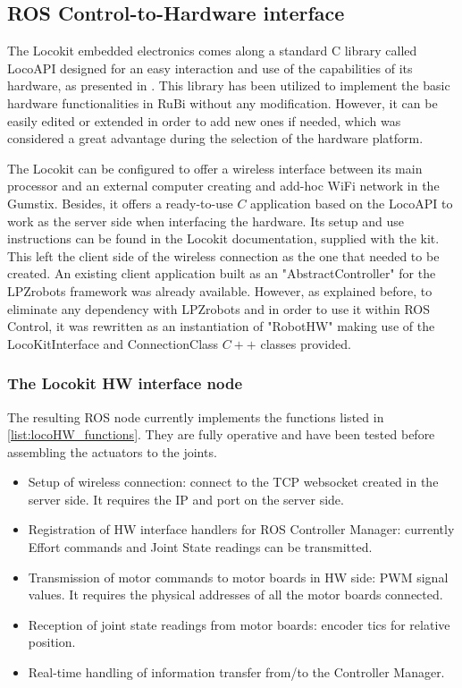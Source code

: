 \subsection{ROS Control-to-Hardware interface} %
\label{sub:ros_control_hardware_locokit_interface}
The Locokit embedded electronics comes along a standard C library called LocoAPI designed for an easy interaction and use of the capabilities of its hardware, as presented in \cite{locokit}.
This library has been utilized to implement the basic hardware functionalities in RuBi without any modification.
However, it can be easily edited or extended in order to add new ones if needed, which was considered a great advantage during the selection of the hardware platform.

The Locokit can be configured to offer a wireless interface between its main processor and an external computer creating and add-hoc WiFi network in the Gumstix.
Besides, it offers a ready-to-use $C$ application based on the LocoAPI to work as the server side when interfacing the hardware.
Its setup and use instructions can be found in the Locokit documentation, supplied with the kit.
This left the client side of the wireless connection as the one that needed to be created.
An existing client application built as an "AbstractController" for the LPZrobots framework was already available. 
However, as explained before, to eliminate any dependency with LPZrobots and in order to use it within ROS Control, it was rewritten as an instantiation of "RobotHW" making use of the LocoKitInterface and ConnectionClass $C++$ classes provided.

\subsubsection{The Locokit HW interface node} %
\label{ssub:the_locokit_hw_interface}
The resulting ROS node currently implements the functions listed in \ref{list:locoHW_functions}.
They are fully operative and have been tested before assembling the actuators to the joints.

\begin{itemize}
\label{list:locoHW_functions}
	\item Setup of wireless connection: connect to the TCP websocket created in the server side. It requires the IP and port on the server side.
	\item Registration of HW interface handlers for ROS Controller Manager: currently Effort commands and Joint State readings can be transmitted.
	\item Transmission of motor commands to motor boards in HW side: PWM signal values. It requires the physical addresses of all the motor boards connected.
	\item Reception of joint state readings from motor boards: encoder tics for relative position.
	\item Real-time handling of information transfer from/to the Controller Manager.
\end{itemize}


